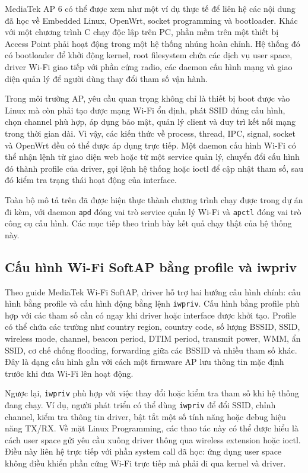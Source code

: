 \documentclass[11pt]{article}
\newcommand{\code}[1]{\texttt{#1}}
\begin{document}
MediaTek AP 6 có thể được xem như một ví dụ thực tế để liên hệ các nội dung đã học về Embedded Linux, OpenWrt, socket programming và bootloader. Khác với một chương trình C chạy độc lập trên PC, phần mềm trên một thiết bị Access Point phải hoạt động trong một hệ thống nhúng hoàn chỉnh. Hệ thống đó có bootloader để khởi động kernel, root filesystem chứa các dịch vụ user space, driver Wi-Fi giao tiếp với phần cứng radio, các daemon cấu hình mạng và giao diện quản lý để người dùng thay đổi tham số vận hành.

Trong môi trường AP, yêu cầu quan trọng không chỉ là thiết bị boot được vào Linux mà còn phải tạo được mạng Wi-Fi ổn định, phát SSID đúng cấu hình, chọn channel phù hợp, áp dụng bảo mật, quản lý client và duy trì kết nối mạng trong thời gian dài. Vì vậy, các kiến thức về process, thread, IPC, signal, socket và OpenWrt đều có thể được áp dụng trực tiếp. Một daemon cấu hình Wi-Fi có thể nhận lệnh từ giao diện web hoặc từ một service quản lý, chuyển đổi cấu hình đó thành profile của driver, gọi lệnh hệ thống hoặc ioctl để cập nhật tham số, sau đó kiểm tra trạng thái hoạt động của interface.

Toàn bộ mô tả trên đã được hiện thực thành chương trình chạy được trong dự án đi kèm, với daemon \code{apd} đóng vai trò service quản lý Wi-Fi và \code{apctl} đóng vai trò công cụ cấu hình. Các mục tiếp theo trình bày kết quả chạy thật của hệ thống này.

\subsection{Cấu hình Wi-Fi SoftAP bằng profile và iwpriv}

Theo guide MediaTek Wi-Fi SoftAP, driver hỗ trợ hai hướng cấu hình chính: cấu hình bằng profile và cấu hình động bằng lệnh \code{iwpriv}. Cấu hình bằng profile phù hợp với các tham số cần có ngay khi driver hoặc interface được khởi tạo. Profile có thể chứa các trường như country region, country code, số lượng BSSID, SSID, wireless mode, channel, beacon period, DTIM period, transmit power, WMM, ẩn SSID, cơ chế chống flooding, forwarding giữa các BSSID và nhiều tham số khác. Đây là dạng cấu hình gần với cách một firmware AP lưu thông tin mặc định trước khi đưa Wi-Fi lên hoạt động.

Ngược lại, \code{iwpriv} phù hợp với việc thay đổi hoặc kiểm tra tham số khi hệ thống đang chạy. Ví dụ, người phát triển có thể dùng \code{iwpriv} để đổi SSID, chỉnh channel, kiểm tra thông tin driver, bật tắt một số tính năng hoặc debug hiệu năng TX/RX. Về mặt Linux Programming, các thao tác này có thể được hiểu là cách user space gửi yêu cầu xuống driver thông qua wireless extension hoặc ioctl. Điều này liên hệ trực tiếp với phần system call đã học: ứng dụng user space không điều khiển phần cứng Wi-Fi trực tiếp mà phải đi qua kernel và driver.
\end{document}
